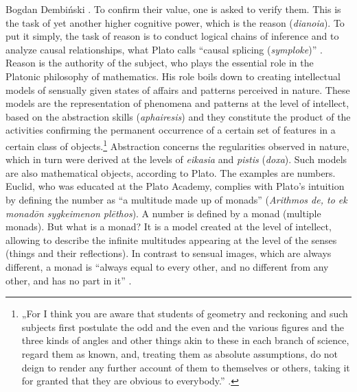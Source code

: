 \begin{artengenv}{Bogdan Dembiński}
\parencite[Meno, 85c.98a.97c]{plato_platonis_1955}.
To confirm their value, one is asked to verify them. This is
the task of yet another higher cognitive power, which is the reason (\textit{dianoia}). To put it
simply, the task of reason is to conduct logical chains of inference and to analyze causal relationships, what Plato
calls ``causal splicing (\textit{symploke})''
\parencite[Meno, 97e-98a]{plato_platonis_1955}.
 Reason is the
authority of the subject, who plays the essential role in the Platonic philosophy of mathematics. His role boils down
to creating intellectual models of sensually given states of affairs and patterns perceived in nature. These models are
the representation of phenomena and patterns at the level of intellect, based on the abstraction skills
(\textit{aphairesis}) and they constitute the product of the activities confirming the permanent occurrence of a
certain set of features in a certain class of objects.\footnote{„For I think you are aware that students of geometry
and reckoning and such subjects first postulate the odd and the even and the various figures and the three kinds of
angles and other things akin to these in each branch of science, regard them as known, and, treating them as absolute
assumptions, do not deign to render any further account of them to themselves or others, taking it for granted that
they are obvious to everybody.''
\parencite[Republic, 510c]{plato_platonis_1955}.
} Abstraction concerns the
regularities observed in nature, which in turn were derived at the levels of \textit{eikasia} and \textit{pistis}
(\textit{doxa}). Such models are also mathematical %
objects, according to Plato. The examples are numbers. Euclid, who was educated at the Plato Academy, complies with
Plato’s intuition by defining the number as ``a multitude made up of monads'' (\textit{Arithmos de, to ek monad\=on
sygkeimenon pl\=ethos}). A number is defined by a monad (multiple monads). But what is a monad? It is a model created
at the level of intellect, allowing to describe the infinite multitudes appearing at the level of the senses (things
and their reflections). In contrast to sensual images, which are always different, a monad is ``always equal to every
other, and no different from any other, and has no part in it''
\parencite[Republic, 526a]{plato_platonis_1955}.

\end{artengenv}
